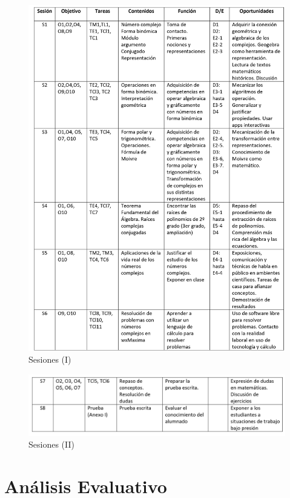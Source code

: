\documentclass[../main.tex]{memoir}
\begin{document}
\begin{figure}[H]

	\includegraphics[scale=0.8]{images/0001.jpg}
	\caption{Sesiones (I)}
	\label{sesiones1}
\end{figure}

\begin{figure}[H]
	
	\includegraphics[scale=0.8]{images/0002.jpg}
	\caption{Sesiones (II)}
	\label{sesiones2}
\end{figure}



\section{Análisis Evaluativo}
\end{document}
